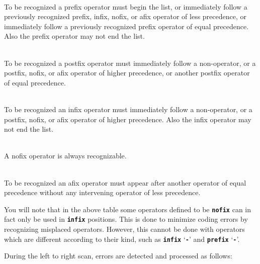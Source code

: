 \documentclass[12pt]{article}
\newcommand{\TT}[1]{{\tt \bfseries #1}}
\newcommand{\ttkey}[1]{{\tt \bfseries #1}}
\newenvironment{indpar}[1][0.3in]%
	{\begin{list}{}%
		     {\setlength{\itemsep}{0in}%
		      \setlength{\topsep}{0in}%
		      \setlength{\parsep}{1ex}%
		      \setlength{\labelwidth}{#1}%
		      \setlength{\leftmargin}{#1}%
		      \addtolength{\leftmargin}{\labelsep}}%
	 \item}%
	{\end{list}}
\begin{document}
\begin{indpar}[0.5in]
\hspace*{-0.3in}\ttkey{prefix} \\
To be recognized a prefix operator must begin the list,
or immediately follow a previously recognized prefix, infix, nofix,
or afix operator of less precedence,
or immediately follow a previously recognized prefix operator of
equal precedence.
Also the prefix operator may not end the list.

\hspace*{-0.3in}\ttkey{postfix} \\
To be recognized a postfix operator must immediately follow a non-operator,
or a postfix, nofix, or afix operator of higher
precedence, or another postfix operator of equal precedence.

\hspace*{-0.3in}\ttkey{infix} \\
To be recognized an infix operator must immediately follow a non-operator,
or a postfix, nofix, or afix operator of higher precedence.
Also the infix operator may not end the list.

\hspace*{-0.3in}\ttkey{nofix} \\
A nofix operator is always recognizable.

\hspace*{-0.3in}\ttkey{afix} \\
To be recognized an afix operator must appear after another
operator of equal precedence without any intervening operator
of less precedence.

\end{indpar}

You will note that in the above table some operators defined
to be \TT{nofix} can in fact only be used in \TT{infix} positions.
This is done to minimize coding errors by recognizing misplaced
operators.  However, this cannot be done with operators which
are different according to their kind, such as \TT{infix} `\TT{-}'
and \TT{prefix} `\TT{-}'.

During the left to right scan, errors are detected and processed
as follows:
\end{document}
